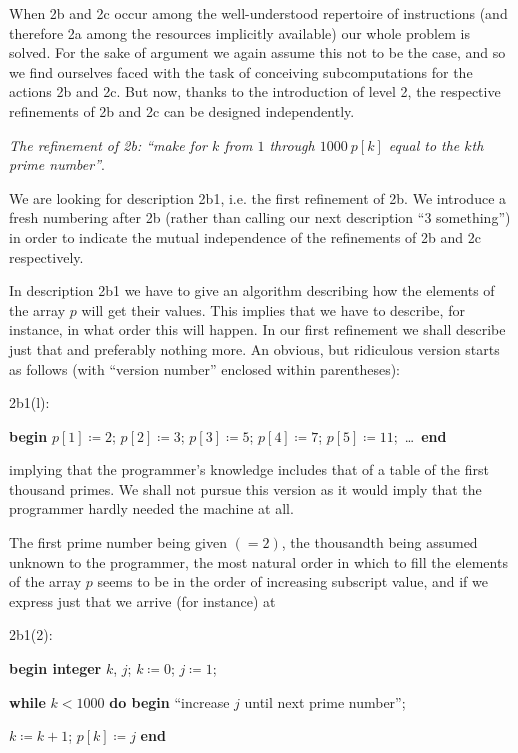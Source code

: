 When 2b and 2c occur among the well-understood repertoire of instructions (and therefore 2a among the resources implicitly available) our whole problem is solved. For the sake of argument we again assume this not to be the case, and so we find ourselves faced with the task of conceiving subcomputations for the actions 2b and 2c. But now, thanks to the introduction of level 2, the respective refinements of 2b and 2c can be designed independently.

\emph{The refinement of 2b: ``make for $k$ from $1$ through $1000\ p[k]$ equal to the $k$\emph{th} prime number''}.

We are looking for description 2b1, i.e. the first refinement of 2b. We introduce a fresh numbering after 2b (rather than calling our next description ``3 something'') in order to indicate the mutual independence of the refinements of 2b and 2c respectively.

In description 2b1 we have to give an algorithm describing how the elements of the array $p$ will get their values. This implies that we have to describe, for instance, in what order this will happen. In our first refinement we shall describe just that and preferably nothing more. An obvious, but ridiculous version starts as follows (with ``version number'' enclosed within parentheses):

\noindent
2b1(l):
\nopagebreak

\noindent
\textbf{begin} $p[1] \coloneq 2$; $p[2] \coloneq 3$; $p[3] \coloneq 5$; $p[4] \coloneq 7$; $p[5] \coloneq 11$;\ \dots\ \textbf{end}

\noindent
implying that the programmer's knowledge includes that of a table of the first thousand primes. We shall not pursue this version as it would imply that the programmer hardly needed the machine at all.

The first prime number being given $(=2)$, the thousandth being assumed unknown to the programmer, the most natural order in which to fill the elements of the array $p$ seems to be in the order of increasing subscript value, and if we express just that we arrive (for instance) at

\noindent
2b1(2):

\noindent
\textbf{begin integer} $k$, $j$; $k \coloneq 0$; $j \coloneq 1$;

\noindent
\quad \textbf{while} $k < 1000$ \textbf{do begin} ``increase $j$ until next prime number'';

\noindent
\quad\quad $k \coloneq k + 1$; $p[k] \coloneq j$ \textbf{end}

